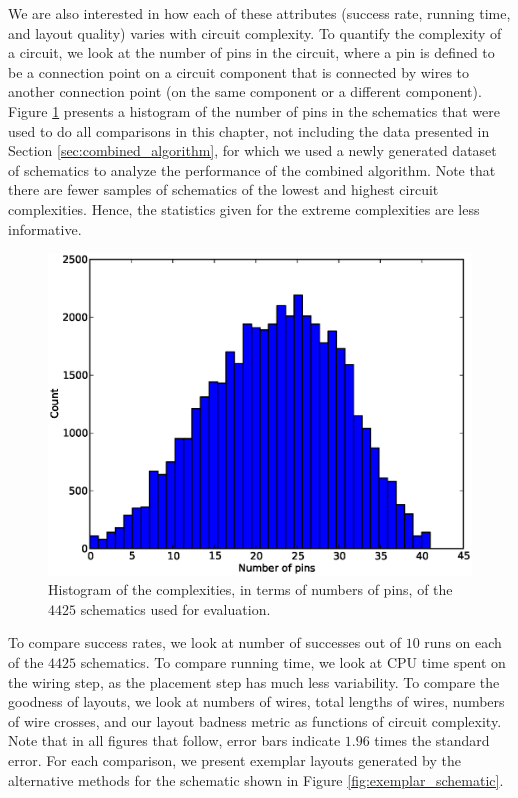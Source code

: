 We are also interested in how each of these attributes (success rate, running
time, and layout quality) varies with circuit complexity. To quantify
the complexity of a circuit, we look at the number of pins in the
circuit, where a pin is defined to be a connection point on a circuit
component that is connected by wires to another connection point (on the same
component or a different component). Figure
\ref{fig:complexity_hist} presents a histogram of the number of pins in the
schematics that were used to do all comparisons in this chapter,
not including the data presented in Section \ref{sec:combined_algorithm}, for
which we used a newly generated dataset of schematics to analyze the performance
of the combined algorithm. Note that there are fewer samples of schematics
of the lowest and highest circuit complexities. Hence, the statistics given
for the extreme complexities are less informative.

\begin{figure}[H]
\begin{center}
\includegraphics[width=\textwidth]{Images/complexity_hist.eps}
\caption[Schematic complexity histogram]{Histogram of the complexities, in terms
of numbers of pins, of the $4425$ schematics used for evaluation.}
\label{fig:complexity_hist}
\end{center}
\end{figure}

To compare success rates, we look at number of successes out of $10$ runs
on each of the $4425$ schematics. To compare running time, we look at CPU
time spent on the wiring step, as the placement step has much less variability.
To compare the goodness of layouts, we look at numbers of wires, total
lengths of wires, numbers of wire crosses, and our layout badness metric as
functions of circuit complexity. Note that in all figures that follow,
error bars indicate $1.96$ times the standard error. For each comparison,
we present exemplar layouts generated by the alternative methods for the
schematic shown in Figure \ref{fig:exemplar_schematic}.

